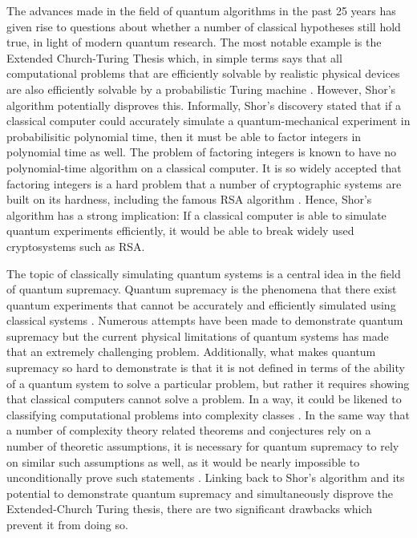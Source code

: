 \documentclass[ %
                    author={Manan Vaswani},
                supervisor={Dr. Raphael Clifford},
                    degree={MEng},
                     title={A multi-core CPU implementation of the classical Boson Sampling algorithm},
                  subtitle={},
                      type={},
                      year={2019} ]{dissertation}
\theoremstyle{plain}
\theoremstyle{definition}
\begin{document}
\noindent
The advances made in the field of quantum algorithms in the past 25 years has given rise to questions about whether a number of classical hypotheses still hold true, in light of modern quantum research. The most notable example is the Extended Church-Turing Thesis which, in simple terms says that all computational problems that are efficiently solvable by realistic physical devices are also efficiently solvable by a probabilistic Turing machine \cite{kaye2007}. However, Shor's algorithm \cite{shor1995} potentially disproves this. Informally, Shor's discovery stated that if a classical computer could accurately simulate a quantum-mechanical experiment in probabilisitic polynomial time, then it must be able to factor integers in polynomial time as well. The problem of factoring integers is known to have no polynomial-time algorithm on a classical computer. It is so widely accepted that factoring integers is a hard problem that a number of cryptographic systems are built on its hardness, including the famous RSA algorithm \cite{rsa1978}. Hence, Shor's algorithm has a strong implication: If a classical computer is able to simulate quantum experiments efficiently, it would be able to break widely used cryptosystems such as RSA.

The topic of classically simulating quantum systems is a central idea in the field of quantum supremacy. Quantum supremacy is the phenomena that there exist quantum experiments that cannot be accurately and efficiently simulated using classical systems \cite{preskill2012}. Numerous attempts have been made to demonstrate quantum supremacy but the current physical limitations of quantum systems has made that an extremely challenging problem. Additionally, what makes quantum supremacy so hard to demonstrate is that it is not defined in terms of the ability of a quantum system to solve a particular problem, but rather it requires showing that classical computers cannot solve a problem. In a way, it could be likened to classifying computational problems into complexity classes \cite{papadimitriou2003}. In the same way that a number of complexity theory related theorems and conjectures rely on a number of theoretic assumptions, it is necessary for quantum supremacy to rely on similar such assumptions as well, as it would be nearly impossible to unconditionally prove such statements \cite{harrow2017}. Linking back to Shor's algorithm and its potential to demonstrate quantum supremacy and simultaneously disprove the Extended-Church Turing thesis, there are two significant drawbacks which prevent it from doing so. 
\end{document}
